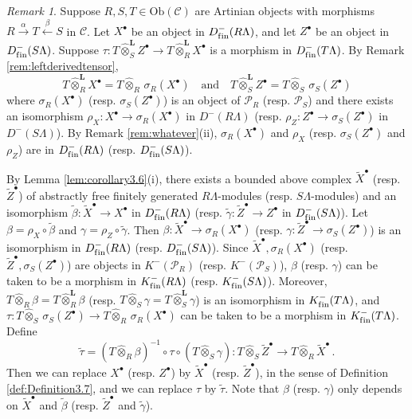 \documentclass{amsart}
\theoremstyle{plain}
\theoremstyle{definition}
\theoremstyle{remark}
\newtheorem{rem}[thm]{Remark}
\begin{document}
\begin{rem}
\label{rem:corollary3.1011}
Suppose $R,S,T\in\mathrm{Ob}(\mathcal{C})$ are Artinian objects with morphisms 
$R\xrightarrow{\alpha} T \xleftarrow{\beta} S$ in $\mathcal{C}$. 
Let $X^\bullet$ be an object in $D^{-}_{\mathrm{f\/in}}(R\Lambda)$, and let $Z^\bullet$ be an object in
$D^{-}_{\mathrm{f\/in}}(S\Lambda)$. 
Suppose $\tau:T\hat{\otimes}^{\mathbf{L}}_{S} Z^\bullet \to T\hat{\otimes}^{\mathbf{L}}_{R} 
X^\bullet$ is a morphism in $D^-_{\mathrm{f\/in}}(T\Lambda)$. By Remark \ref{rem:leftderivedtensor},
$$ T\hat{\otimes}^{\mathbf{L}}_{R} X^\bullet= T\hat{\otimes}_R\,\sigma_R(X^\bullet)
\quad\mbox{and}\quad
T\hat{\otimes}^{\mathbf{L}}_{S} Z^\bullet =T\hat{\otimes}_S\,\sigma_S(Z^\bullet)$$
where $\sigma_R(X^\bullet)$ (resp. $\sigma_S(Z^\bullet)$) is an object of 
$\mathcal{P}_R$ (resp. $\mathcal{P}_S$) and there exists an isomorphism
$\rho_X:X^\bullet\to \sigma_R(X^\bullet)$ in $D^-(R\Lambda)$
(resp. $\rho_Z:Z^\bullet\to\sigma_S(Z^\bullet)$ in $D^-(S\Lambda)$).
By Remark \ref{rem:whatever}(ii), $\sigma_R(X^\bullet)$ and $\rho_X$ (resp. $\sigma_S(Z^\bullet)$
and $\rho_Z$) are in $D^-_{\mathrm{f\/in}}(R\Lambda)$ (resp. $D^-_{\mathrm{f\/in}}(S\Lambda)$).

By Lemma \ref{lem:corollary3.6}(i), there exists a bounded above complex $\tilde{X}^\bullet$
(resp. $\tilde{Z}^\bullet$) of abstractly free finitely generated $R\Lambda$-modules
(resp. $S\Lambda$-modules) and an isomorphism 
$\tilde{\beta}: \tilde{X}^\bullet\to X^\bullet$ in $D^{-}_{\mathrm{f\/in}}(R\Lambda)$
(resp. $\tilde{\gamma}: \tilde{Z}^\bullet\to Z^\bullet$ in $D^{-}_{\mathrm{f\/in}}(S\Lambda)$). 
Let $\beta=\rho_X\circ\tilde{\beta}$ and $\gamma=\rho_Z\circ\tilde{\gamma}$.
Then $\beta:\tilde{X}^\bullet\to \sigma_R(X^\bullet)$ (resp. 
$\gamma:\tilde{Z}^\bullet\to\sigma_S(Z^\bullet)$) is an isomorphism in $D^{-}_{\mathrm{f\/in}}(R\Lambda)$
(resp. $D^{-}_{\mathrm{f\/in}}(S\Lambda)$). Since $\tilde{X}^\bullet,\sigma_R(X^\bullet)$ (resp.
$\tilde{Z}^\bullet,\sigma_S(Z^\bullet)$) are objects in $K^-(\mathcal{P}_R)$ (resp. $K^-(\mathcal{P}_S)$),
$\beta$ (resp. $\gamma$) can be taken to be a morphism in $K^{-}_{\mathrm{f\/in}}(R\Lambda)$
(resp. $K^{-}_{\mathrm{f\/in}}(S\Lambda)$). Moreover, $T\hat{\otimes}_R\beta=T\hat{\otimes}^{\mathbf{L}}_{R} \beta$ 
(resp. $T\hat{\otimes}_S\gamma=T\hat{\otimes}^{\mathbf{L}}_{S} \gamma$)
is an isomorphism in $K^{-}_{\mathrm{f\/in}}(T\Lambda)$, and $\tau:T\hat{\otimes}_S\,\sigma_S(Z^\bullet)
\to T\hat{\otimes}_R\,\sigma_R(X^\bullet)$ can be taken to be a morphism in $K^{-}_{\mathrm{f\/in}}(T\Lambda)$.
Define
\begin{equation}
\label{eq:replace}
\tilde{\tau}=(T\hat{\otimes}_R\beta)^{-1}\circ\tau\circ(T\hat{\otimes}_S\gamma):
T\hat{\otimes}_S\tilde{Z}^\bullet \to T\hat{\otimes}_R\tilde{X}^\bullet \,.
\end{equation}
Then we can replace $X^\bullet$ (resp. $Z^\bullet$) by $\tilde{X}^\bullet$ (resp. $\tilde{Z}^\bullet$),
in the sense of Definition \ref{def:Definition3.7}, and we can replace $\tau$ by $\tilde{\tau}$.
Note that $\beta$ (resp. $\gamma$) only depends on $\tilde{X}^\bullet$ and 
$\tilde{\beta}$ (resp. $\tilde{Z}^\bullet$ and $\tilde{\gamma}$).
\end{rem}
\end{document}
